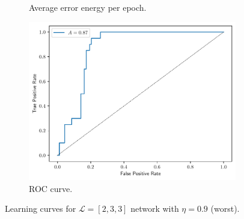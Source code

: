 \documentclass[conference]{IEEEtran}
\theoremstyle{definition}
\theoremstyle{remark}
\theoremstyle{remark}
\begin{document}
\begin{figure}
\begin{subfigure}[b]{0.32\textwidth}
        \caption{Average error energy per epoch.}
    \end{subfigure}
    \begin{subfigure}[b]{0.32\textwidth}
        \centering
        \includegraphics[width=\textwidth]{figs/2-3-3-0.9-emb-roc.pdf}
        \caption{ROC curve.}
    \end{subfigure}
    \caption{Learning curves for $\mathcal{L}=[2,3,3]$ network with $\eta=0.9$
    (worst).}
\end{figure}
\end{document}
